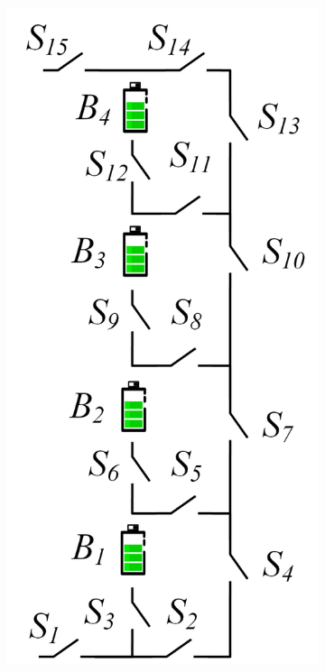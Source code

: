 \documentclass{article}
\begin{document}
\begin{figure}[htbp]
    \centering
    \begin{subfigure}[b]{0.2\textwidth}
        \includegraphics[width=\textwidth]{stru-L-origin.png}

\end{subfigure}
\end{figure}
\end{document}
